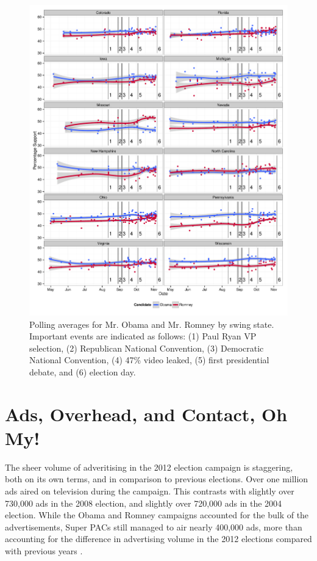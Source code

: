 \documentclass[11pt]{article}\usepackage{graphicx, color}
\newenvironment{knitrout}{}{} %
\begin{document}
\begin{knitrout}
\color{fgcolor}\begin{figure}[H]


{\centering \includegraphics[width=\textwidth]{figure/type_swing_1} 

}

\caption[Polling averages for Mr]{Polling averages for Mr. Obama and Mr. Romney by swing state. Important events are indicated as follows: (1) Paul Ryan VP selection, (2) Republican National Convention, (3) Democratic National Convention, (4) 47\% video leaked, (5) first presidential debate, and (6) election day.\label{fig:type_swing_1}}
\end{figure}


\end{knitrout}


\section{Ads, Overhead, and Contact, Oh My!}
The sheer volume of adveritising in the 2012 election campaign is staggering, both on its own terms, and in comparison to previous elections.  Over one million ads aired on television during the campaign.  This contrasts with slightly over 730,000 ads in the 2008 election, and slightly over 720,000 ads in the 2004 election.  While the Obama and Romney campaigns accounted for the bulk of the advertisements, Super PACs still managed to air nearly 400,000 ads, more than accounting for the difference in advertising volume in the 2012 elections compared with previous years \cite{lb-airings}.
\end{document}

